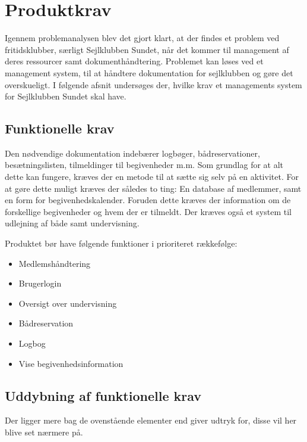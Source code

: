 \chapter{Produktkrav}

Igennem problemanalysen blev det gjort klart, at der findes et problem ved fritidsklubber, særligt Sejlklubben Sundet, når det kommer til management af deres ressourcer samt dokumenthåndtering. 
Problemet kan løses ved et management system, til at håndtere dokumentation for sejlklubben og gøre det overskueligt. 
I følgende afsnit undersøges der, hvilke krav et managements system for Sejlklubben Sundet skal have. 


\section{Funktionelle krav} \label{sec:funktionelleKrav}

Den nødvendige dokumentation indebærer logbøger, bådreservationer, besætningslisten, tilmeldinger til begivenheder m.m. 
Som grundlag for at alt dette kan fungere, kræves der en metode til at sætte sig selv på en aktivitet. 
For at gøre dette muligt kræves der således to ting: En database af medlemmer, samt en form for begivenhedskalender. 
Foruden dette kræves der information om de forskellige begivenheder og hvem der er tilmeldt. 
Der kræves også et system til udlejning af både samt undervisning.

Produktet bør have følgende funktioner i prioriteret rækkefølge:
\begin{itemize}
  \item Medlemshåndtering
  \item Brugerlogin
  \item Oversigt over undervisning
  \item Bådreservation
  \item Logbog
  \item Vise begivenhedsinformation
\end{itemize}



\section{Uddybning af funktionelle krav}

Der ligger mere bag de ovenstående elementer end  giver udtryk for, disse vil her blive set nærmere på.

